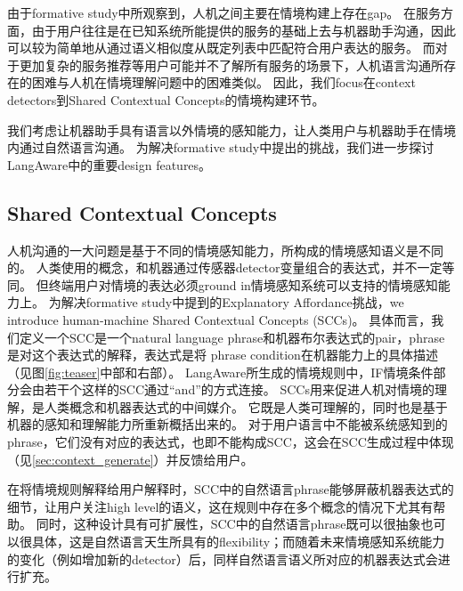 由于formative study中所观察到，人机之间主要在情境构建上存在gap。
在服务方面，由于用户往往是在已知系统所能提供的服务的基础上去与机器助手沟通，因此可以较为简单地从通过语义相似度从既定列表中匹配符合用户表达的服务。
而对于更加复杂的服务推荐等用户可能并不了解所有服务的场景下，人机语言沟通所存在的困难与人机在情境理解问题中的困难类似。
因此，我们focus在context detectors到Shared Contextual Concepts的情境构建环节。

我们考虑让机器助手具有语言以外情境的感知能力，让人类用户与机器助手在情境内通过自然语言沟通。
为解决formative study中提出的挑战，我们进一步探讨LangAware中的重要design features。

\subsection{Shared Contextual Concepts}
\label{sec:SCC}

人机沟通的一大问题是基于不同的情境感知能力，所构成的情境感知语义是不同的。
人类使用的概念，和机器通过传感器detector变量组合的表达式，并不一定等同。
但终端用户对情境的表达必须ground in情境感知系统可以支持的情境感知能力上。
为解决formative study中提到的Explanatory Affordance挑战，we introduce human-machine Shared Contextual Concepts (SCCs)。
具体而言，我们定义一个SCC是一个natural language phrase和机器布尔表达式的pair，phrase是对这个表达式的解释，表达式是将 phrase condition在机器能力上的具体描述（见图\ref{fig:teaser}中部和右部）。
LangAware所生成的情境规则中，IF情境条件部分会由若干个这样的SCC通过“and”的方式连接。
SCCs用来促进人机对情境的理解，是人类概念和机器表达式的中间媒介。
它既是人类可理解的，同时也是基于机器的感知和理解能力所重新概括出来的。
对于用户语言中不能被系统感知到的phrase，它们没有对应的表达式，也即不能构成SCC，这会在SCC生成过程中体现（见\ref{sec:context_generate}）并反馈给用户。


在将情境规则解释给用户解释时，SCC中的自然语言phrase能够屏蔽机器表达式的细节，让用户关注high level的语义，这在规则中存在多个概念的情况下尤其有帮助。
同时，这种设计具有可扩展性，SCC中的自然语言phrase既可以很抽象也可以很具体，这是自然语言天生所具有的flexibility；而随着未来情境感知系统能力的变化（例如增加新的detector）后，同样自然语言语义所对应的机器表达式会进行扩充。

